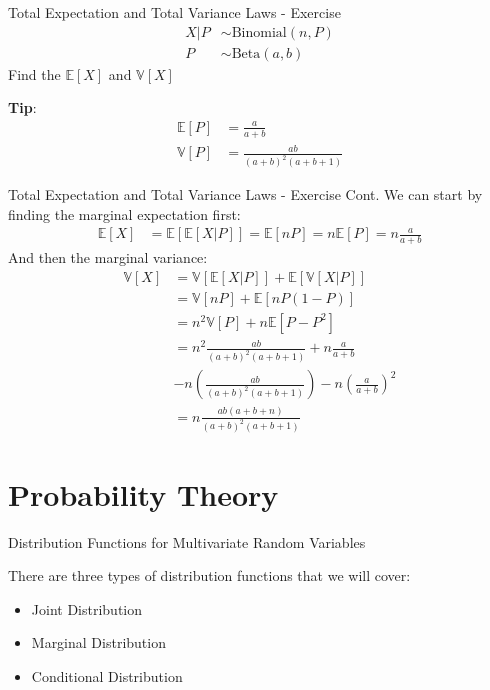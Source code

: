 \documentclass{beamer}
\begin{document}
\begin{frame}{Total Expectation and Total Variance Laws - Exercise}
\begin{align*}
X|P&\sim\mathrm{Binomial}(n, P) \\
P &\sim\mathrm{Beta}(a, b)
\end{align*}
\newline
Find the $\mathbb{E}[X]$ and $\mathbb{V}[X]$

\textbf{Tip}:
\begin{align*}
\mathbb{E}[P] &= \frac{a}{a+b} \\
\mathbb{V}[P] &= \frac{ab}{(a+b)^{2}(a+b+1)}
\end{align*}
\end{frame}


\begin{frame}{Total Expectation and Total Variance Laws - Exercise Cont.}
We can start by finding the marginal expectation first:
\begin{align*}
\mathbb{E}[X] &= \mathbb{E}[\mathbb{E}[X|P]] = \mathbb{E}[nP] = n \mathbb{E}[P] = n \frac{a}{a+b}
\end{align*}
And then the marginal variance:
\begin{align*}
\mathbb{V}[X] &= \mathbb{V}[\mathbb{E}[X|P]] + \mathbb{E}[\mathbb{V}[X|P]]\\
&= \mathbb{V}[nP] + \mathbb{E}[nP(1-P)]\\
&= n^{2}\mathbb{V}[P] + n\mathbb{E}[P - P^{2}] \\
& = n^{2} \frac{ab}{(a+b)^{2}(a+b+1)} + n \frac{a}{a+b} \\ &- n (\frac{ab}{(a+b)^{2}(a+b+1)}) - n (\frac{a}{a+b})^{2}\\
& = n \frac{ab(a+b+n)}{(a+b)^{2}(a+b+1)}
\end{align*}
\end{frame}


\section{Probability Theory}

\begin{frame}{Distribution Functions for Multivariate Random Variables}

There are three types of distribution functions that we will cover:
\begin{itemize}
\item{Joint Distribution}
\item{Marginal Distribution}
\item{Conditional Distribution}
\end{itemize}
\end{frame}
\end{document}
